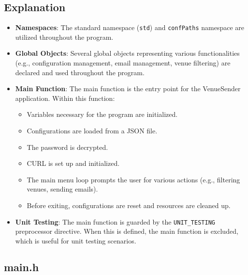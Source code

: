 \documentclass{article}
\begin{document}
	\subsection*{Explanation}
	\begin{itemize}
		\item \textbf{Namespaces}: The standard namespace (\texttt{std}) and \texttt{confPaths} namespace are utilized throughout the program.
		\item \textbf{Global Objects}: Several global objects representing various functionalities (e.g., configuration management, email management, venue filtering) are declared and used throughout the program.
		\item \textbf{Main Function}: The main function is the entry point for the VenueSender application. Within this function:
		\begin{itemize}
			\item Variables necessary for the program are initialized.
			\item Configurations are loaded from a JSON file.
			\item The password is decrypted.
			\item CURL is set up and initialized.
			\item The main menu loop prompts the user for various actions (e.g., filtering venues, sending emails).
			\item Before exiting, configurations are reset and resources are cleaned up.
		\end{itemize}
		\item \textbf{Unit Testing}: The main function is guarded by the \texttt{UNIT\_TESTING} preprocessor directive. When this is defined, the main function is excluded, which is useful for unit testing scenarios.
	\end{itemize}
	
	\subsection{main.h}
	
\end{document}
